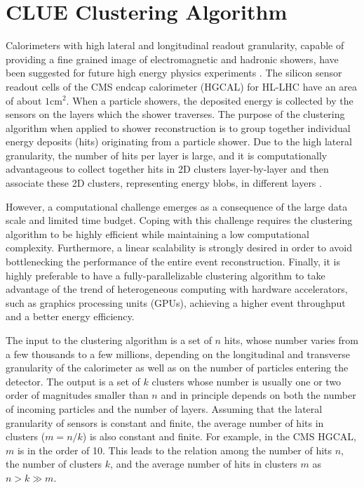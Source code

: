 


\section{CLUE Clustering Algorithm}
\label{sec:algorithm}

Calorimeters with high lateral and longitudinal readout granularity, capable of providing a fine grained image of electromagnetic and hadronic showers, have been suggested for future high energy physics experiments \cite{calice2012calorimetry}. The  silicon sensor readout cells of the CMS endcap calorimeter (HGCAL) \cite{Collaboration:2293646} for HL-LHC \cite{Apollinari:2284929} have an area of about $1 \mathrm{cm}^2$.
When a particle showers, the deposited energy is collected by the sensors on the layers which the shower traverses. 
The purpose of the clustering algorithm when applied to shower reconstruction is to group together individual energy deposits (hits) originating from a particle shower. Due to the high lateral granularity, the number of hits per layer is large, and it is computationally advantageous to collect together hits in 2D clusters layer-by-layer \cite{Chen:2017btc} and then associate these 2D clusters, representing energy blobs, in different layers \cite{Collaboration:2293646}.



However, a computational challenge emerges as a consequence of the large data scale and limited time budget. %
Coping with this challenge requires the clustering algorithm to be highly efficient while maintaining a low computational complexity. Furthermore, a linear scalability is strongly desired in order to avoid bottlenecking the performance of the entire event reconstruction.  Finally, it is highly preferable to have a fully-parallelizable clustering algorithm to take advantage of the trend of heterogeneous computing with hardware accelerators, such as graphics processing units (GPUs), achieving a higher event throughput and a better energy efficiency.



The input to the clustering algorithm is a set of $n$ hits, whose number varies from a few thousands to a few millions, depending on the longitudinal and transverse granularity of the calorimeter as well as on the number of particles entering the detector. The output is a set of $k$ clusters whose number is usually one or two order of magnitudes smaller than $n$ and in principle depends on both the number of incoming particles and the number of layers. Assuming that the lateral granularity of sensors is constant and finite, the average number of hits in clusters ($m=n/k$) is also constant and finite. For example, in the CMS HGCAL, $m$ is in the order of 10. This leads to the relation among the number of hits $n$, the number of clusters $k$, and the average number of hits in clusters $m$ as $n > k \gg m$.



